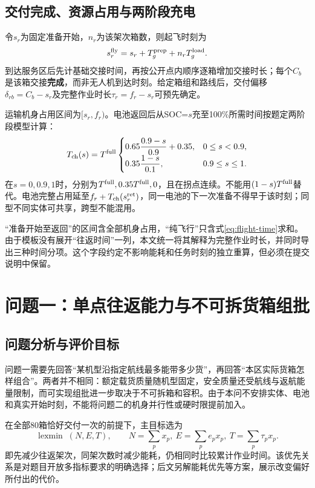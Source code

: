\documentclass[a4paper]{my_paper}%
\numberwithin{equation}{section}
\newcommand{\lexmin}{\operatorname{lexmin}}
\theoremstyle{definition}
\begin{document}
\subsection{交付完成、资源占用与两阶段充电}
令$s_r$为固定准备开始，$n_r$为该架次箱数，则起飞时刻为
\begin{equation}
 s_r^{\rm fly}=s_r+T_g^{\rm prep}+n_rT_g^{\rm load}.
 \label{eq:takeoff}
\end{equation}
到达服务区后先计基础交接时间，再按公开点内顺序逐箱增加交接时长；每个$C_b$是该箱交接\textbf{完成}，而非无人机到达时刻。给定箱组和路线后，交付偏移$\delta_{rb}=C_b-s_r$及完整作业时长$\tau_r=f_r-s_r$可预先确定。

运输机身占用区间为$[s_r,f_r)$。电池返回后从SOC=$s$充至100\%所需时间按题定两阶段模型计算：
\begin{equation}
 T_{\rm ch}(s)=T^{\rm full}\begin{cases}
 0.65\dfrac{0.9-s}{0.9}+0.35,&0\le s<0.9,\\[3pt]
 0.35\dfrac{1-s}{0.1},&0.9\le s\le1.
 \end{cases}
 \label{eq:charge}
\end{equation}
在$s=0,0.9,1$时，分别为$T^{\rm full},0.35T^{\rm full},0$，且在拐点连续。不能用$(1-s)T^{\rm full}$替代。电池完整占用延至$f_r+T_{\rm ch}(s_r^{\rm ret})$，同一电池的下一次准备不得早于该时刻；同型不同实体可共享，跨型不能混用。

“准备开始至返回”的区间含全部机身占用，“纯飞行”只含式\eqref{eq:flight-time}求和。由于模板没有展开“往返时间”一列，本文统一将其解释为完整作业时长，并同时导出三种时间分项。这个字段约定不影响能耗和任务时刻的独立重算，但必须在提交说明中保留。


\section{问题一：单点往返能力与不可拆货箱组批}
\subsection{问题分析与评价目标}
问题一需要先回答“某机型沿指定航线最多能带多少货”，再回答“本区实际货箱怎样组合”。两者并不相同：额定载货质量随机型固定，安全质量还受航线与返航能量限制，而可实现组批进一步取决于不可拆箱和容积。由于本问不安排实体、电池和真实开始时刻，不能将问题二的机身并行性或硬时限提前加入。

在全部80箱恰好交付一次的前提下，主目标选为
\begin{equation}
 \lexmin\;(N,E,T),\qquad
 N=\sum_p x_p,\ E=\sum_pe_px_p,\ T=\sum_p\tau_px_p.
 \label{eq:q1-objective}
\end{equation}
即先减少往返架次，同架次数时减少能耗，仍相同时比较累计作业时间。该优先关系是对题目开放多指标要求的明确选择；后文另解能耗优先等方案，展示改变偏好所付出的代价。
\end{document}
